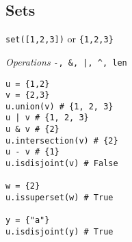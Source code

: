 \subsection{Sets}
\texttt{set([1,2,3])}  or \texttt{\{1,2,3\}}

\textit{Operations}
\texttt{-, \&, |, \textasciicircum, len}

\begin{lstlisting}
u = {1,2}
v = {2,3}
u.union(v) # {1, 2, 3}
u | v # {1, 2, 3}
u & v # {2}
u.intersection(v) # {2}
u - v # {1}
u.isdisjoint(v) # False

w = {2}
u.issuperset(w) # True

y = {"a"}
u.isdisjoint(y) # True
\end{lstlisting}
